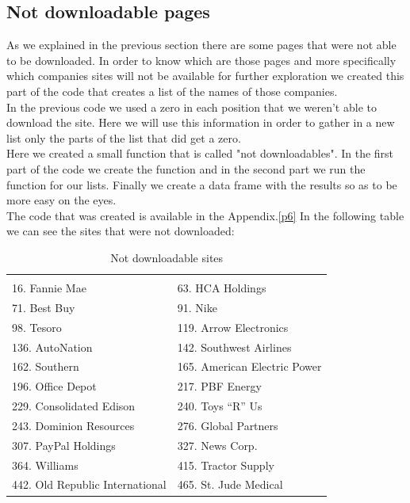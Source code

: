 \documentclass{book}
\begin{document}
\subsection{Not downloadable pages}
As we explained in the previous section there are some pages that were not able to be downloaded. In order to know which are those pages and more specifically which companies sites will not be available for further exploration we created this part of the code that creates a list of the names of those companies.\\
In the previous code we used a zero in each position that we weren't able to download the site. Here we will use this information in order to gather in a new list only the parts of the list that did get a zero.\\
Here we created a small function that is called "not downloadables". In the first part of the code we create the function and in the second part we run the function for our lists. Finally we create a data frame with the results so as to be more easy on the eyes.\\
The code that was created is available in the Appendix.\ref{p6}
In the following table we can see the sites that were not downloaded: 
\begin{table}[H]
\centering
\caption{Not downloadable sites}
\begin{tabular}{ll}
\hline
 &  \\ 
16. Fannie Mae 
& 63. HCA Holdings \\
71. Best Buy
& 91. Nike \\
98. Tesoro 
& 119. Arrow Electronics\\
136. AutoNation
& 142. Southwest Airlines \\
162. Southern 
& 165. American Electric Power\\
196. Office Depot 
& 217. PBF Energy \\
229. Consolidated Edison
& 240. Toys “R” Us \\
243. Dominion Resources 
& 276. Global Partners\\
307. PayPal Holdings 
& 327. News Corp. \\
364. Williams 
& 415. Tractor Supply\\ 
442. Old Republic International 
& 465. St. Jude Medical \\
\hline
\end{tabular}
\end{table}
\end{document}
